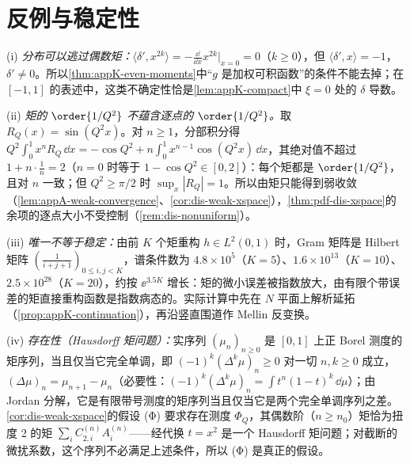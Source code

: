 \section{反例与稳定性}\label{sec:appK-counterexamples}

\begin{remark}[反例与稳定性]\label{rem:appK-counterexamples}
(i) \emph{分布可以逃过偶数矩：}$\langle\delta',x^{2k}\rangle=-\frac{\dd}{\dd x}x^{2k}|_{x=0}=0$（$k\ge0$），但 $\langle\delta',x\rangle=-1$，$\delta'\ne0$。所以\cref{thm:appK-even-moments}中“$g$ 是加权可积函数”的条件不能去掉；在 $[-1,1]$ 的表述中，这类不确定性恰是\cref{lem:appK-compact}中 $\xi=0$ 处的 $\delta$ 导数。

(ii) \emph{矩的 $\order{1/Q^2}$ 不蕴含逐点的 $\order{1/Q^2}$。}取 $R_Q(x)=\sin(Q^2x)$。对 $n\ge1$，分部积分得 $Q^2\int_0^1x^nR_Q\,\dd x=-\cos Q^2+n\int_0^1x^{n-1}\cos(Q^2x)\,\dd x$，其绝对值不超过 $1+n\cdot\frac1n=2$（$n=0$ 时等于 $1-\cos Q^2\in[0,2]$）：每个矩都是 $\order{1/Q^2}$，且对 $n$ 一致；但 $Q^2\ge\pi/2$ 时 $\sup_x|R_Q|=1$。所以由矩只能得到弱收敛（\cref{lem:appA-weak-convergence}、\cref{cor:dis-weak-xspace}），\cref{thm:pdf-dis-xspace}的余项的逐点大小不受控制（\cref{rem:dis-nonuniform}）。

(iii) \emph{唯一不等于稳定：}由前 $K$ 个矩重构 $h\in L^2(0,1)$ 时，Gram 矩阵是 Hilbert 矩阵 $(\frac1{i+j+1})_{0\le i,j<K}$，谱条件数为 $4.8\times10^5$（$K=5$）、$1.6\times10^{13}$（$K=10$）、$2.5\times10^{28}$（$K=20$），约按 $\ee^{3.5K}$ 增长：矩的微小误差被指数放大，由有限个带误差的矩直接重构函数是指数病态的。实际计算中先在 $N$ 平面上解析延拓（\cref{prop:appK-continuation}），再沿竖直围道作 Mellin 反变换。

(iv) \emph{存在性（Hausdorff 矩问题）：}实序列 $(\mu_n)_{n\ge0}$ 是 $[0,1]$ 上正 Borel 测度的矩序列，当且仅当它完全单调，即 $(-1)^k(\Delta^k\mu)_n\ge0$ 对一切 $n,k\ge0$ 成立，$(\Delta\mu)_n=\mu_{n+1}-\mu_n$\cite{Hausdorff1921a,Hausdorff1921b}（必要性：$(-1)^k(\Delta^k\mu)_n=\int t^n(1-t)^k\,\dd\mu$）；由 Jordan 分解，它是有限带号测度的矩序列当且仅当它是两个完全单调序列之差。\cref{cor:dis-weak-xspace}的假设 (Φ) 要求存在测度 $\Phi_Q$，其偶数阶（$n\ge n_0$）矩恰为扭度 2 的矩 $\sum_iC^{(n)}_{2,i}A^{(n)}_i$——经代换 $t=x^2$ 是一个 Hausdorff 矩问题；对截断的微扰系数，这个序列不必满足上述条件，所以 (Φ) 是真正的假设。
\end{remark}
